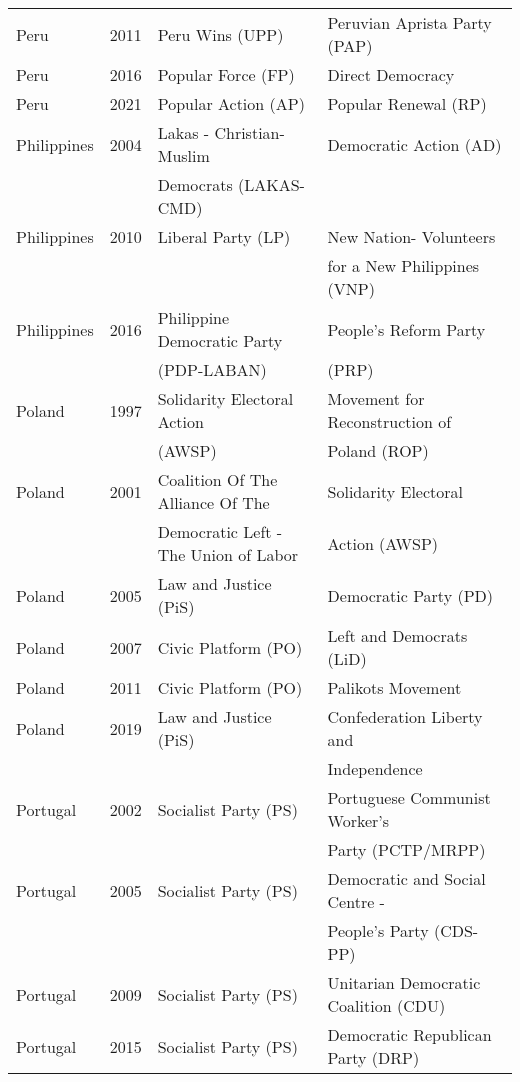 {\begin{longtable}{|l|c|l|l|}
Peru & 2011 &   Peru Wins (UPP)   &   Peruvian Aprista Party (PAP)   \\ 
Peru & 2016 &   Popular Force (FP)   &   Direct Democracy \\ 
Peru & 2021 &   Popular Action (AP) &   Popular Renewal (RP)   \\ 
Philippines & 2004 &   Lakas - Christian-Muslim   &   Democratic Action (AD) \\ 
    &   &   Democrats (LAKAS-CMD) &   \\ 
  Philippines & 2010 &   Liberal Party (LP) &   New Nation- Volunteers  \\ 
    &   &     &    for a New Philippines (VNP) \\ 
   Philippines & 2016 &   Philippine Democratic Party  &   People's Reform Party   \\ 
    &  &     (PDP-LABAN) &    (PRP) \\ 
  Poland & 1997 &   Solidarity Electoral Action   &   Movement for Reconstruction of  \\ 
               &      &      (AWSP)    &    Poland (ROP) \\ 
  Poland & 2001 &   Coalition Of The Alliance Of The  &   Solidarity Electoral    \\ 
    &  &   Democratic   Left - The Union of  Labor &     Action (AWSP)  \\ 
  Poland & 2005 &   Law and Justice (PiS) &   Democratic Party (PD) \\ 
  Poland & 2007 &   Civic Platform (PO) &   Left and Democrats (LiD)  \\ 
  Poland & 2011 &   Civic Platform (PO) &   Palikots Movement \\ 
   Poland & 2019 &   Law and Justice (PiS) &   Confederation Liberty and  \\ 
               &      &         &     Independence  \\ 
   Portugal & 2002 &   Socialist Party (PS) &   Portuguese Communist Worker's \\ 
               &      &         &    Party (PCTP/MRPP)  \\ 
   Portugal & 2005 &   Socialist Party (PS) &   Democratic and Social Centre -  \\ 
               &      &         & People's Party (CDS-PP)    \\ 
Portugal & 2009 &   Socialist Party (PS) &   Unitarian Democratic Coalition (CDU)  \\ 
Portugal & 2015 &   Socialist Party (PS) &   Democratic Republican Party (DRP)  \\ 

\end{longtable}}
